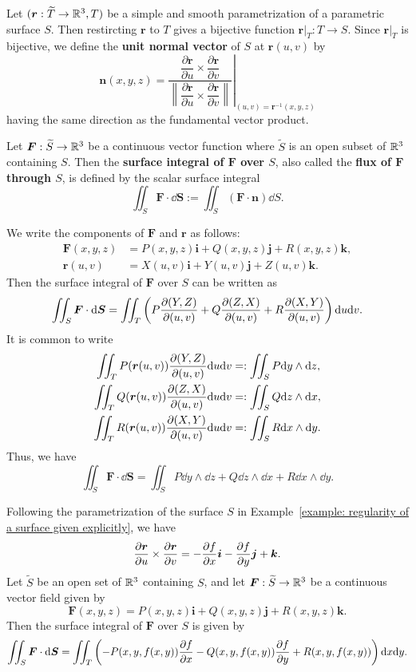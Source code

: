 \begin{definitionenv}
    Let $(\bm r: \widetilde T\to \mathbb{R}^3, T)$ be a simple and smooth parametrization of a parametric surface $S$. Then restircting $\bm r$ to $T$ gives a bijective function $\bm r\big|_T: T\to S$. Since $\bm r\big|_T$ is bijective, we define the \textbf{unit normal vector} of $S$ at $\bm r(u,v)$ by
    $$ \bm n(x,y,z) = \left.\frac{\dfrac{\partial \bm r}{\partial u}\times \dfrac{\partial \bm r}{\partial v}}{\left\| \dfrac{\partial \bm r}{\partial u}\times \dfrac{\partial \bm r}{\partial v} \right\|} \right|_{(u,v) = \bm r^{-1}(x,y,z)}$$
    having the same direction as the fundamental vector product.

    Let $\bm F: \widetilde S\to \mathbb{R}^3$ be a continuous vector function where $\widetilde S$ is an open subset of $\mathbb{R}^3$ containing $S$. Then the \textbf{surface integral of $\bm F$ over $S$}, also called the \textbf{flux of $\bm F$ through $S$}, is defined by the scalar surface integral
    $$ \iint_S \bm F \cdot \dd \bm S := \iint_S  \left(\bm F \cdot \bm n \right) \dd S.$$
\end{definitionenv}
\begin{remarkenv}
    We write the components of $\bm F$ and $\bm r$ as follows:
    $$ \begin{aligned}
        \bm F(x,y,z) &= P(x,y,z)\bm i + Q(x,y,z)\bm j + R(x,y,z)\bm k,\\
        \bm r(u,v) &= X(u,v)\bm i + Y(u,v)\bm j + Z(u,v)\bm k.
    \end{aligned}
    $$
    Then the surface integral of $\bm F$ over $S$ can be written as
    $$ \iint_S \bm F \cdot \dd \bm S = \iint_T \left( P\frac{\partial\!\left(Y,Z\right)}{\partial\!\left(u,v\right)} + Q\frac{\partial\!\left(Z,X\right)}{\partial\!\left(u,v\right)} + R\frac{\partial\!\left(X,Y\right)}{\partial\!\left(u,v\right)} \right) \dd u \dd v. $$
    It is common to write
    $$
    \begin{aligned}
        \iint_T P(\bm r(u,v)) \frac{\partial\!\left(Y,Z\right)}{\partial\!\left(u,v\right)} \dd u \dd v &=: \iint_S P \dd y \wedge \dd z,\\
        \iint_T Q(\bm r(u,v)) \frac{\partial\!\left(Z,X\right)}{\partial\!\left(u,v\right)} \dd u \dd v &=: \iint_S Q \dd z \wedge \dd x,\\
        \iint_T R(\bm r(u,v)) \frac{\partial\!\left(X,Y\right)}{\partial\!\left(u,v\right)} \dd u \dd v &=: \iint_S R \dd x \wedge \dd y.
    \end{aligned}
    $$
    Thus, we have
    $$ \iint_S \bm F \cdot \dd \bm S = \iint_S P \dd y \wedge \dd z + Q \dd z \wedge \dd x + R \dd x \wedge \dd y. $$
\end{remarkenv}
\begin{exampleenv}
    Following the parametrization of the surface $S$ in Example~\ref{example: regularity of a surface given explicitly}, we have
    $$ \pdv{\bm r}{u}\times \pdv{\bm r}{v} = -\pdv{f}{x}\bm i - \pdv{f}{y}\bm j + \bm k. $$
    Let $\widetilde S$ be an open set of $\mathbb{R}^3$ containing $S$, and let $\bm F: \widetilde S\to \mathbb{R}^3$ be a continuous vector field given by
    $$ \bm F(x,y,z) = P(x,y,z)\bm i + Q(x,y,z)\bm j + R(x,y,z)\bm k. $$
    Then the surface integral of $\bm F$ over $S$ is given by
    $$ \iint_S \bm F \cdot \dd \bm S = \iint_T \left( -P(x,y,f(x,y))\pdv{f}{x} - Q(x,y,f(x,y))\pdv{f}{y} + R(x,y,f(x,y)) \right) \dd x \dd y. $$
\end{exampleenv}

